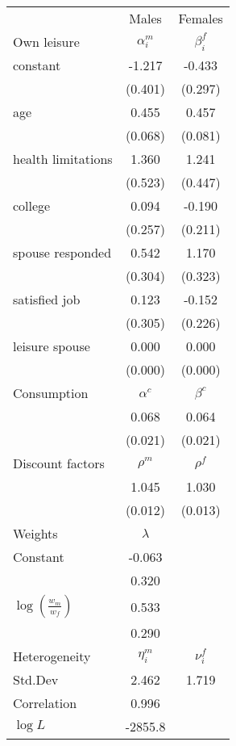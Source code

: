 \begin{tabular}{lcc} 
\hline\hline 
 & Males & Females \\ 
Own leisure & $\alpha_{i}^{m}$ & $\beta_{i}^{f}$ \\ 
constant & -1.217 & -0.433 \\ 
 & (0.401) & (0.297) \\ 
age & 0.455 & 0.457 \\ 
 & (0.068) & (0.081) \\ 
health limitations & 1.360 & 1.241 \\ 
 & (0.523) & (0.447) \\ 
college & 0.094 & -0.190 \\ 
 & (0.257) & (0.211) \\ 
spouse responded & 0.542 & 1.170 \\ 
 & (0.304) & (0.323) \\ 
satisfied job & 0.123 & -0.152 \\ 
 & (0.305) & (0.226) \\ 
leisure spouse & 0.000 & 0.000 \\ 
 & (0.000) & (0.000) \\ 
Consumption & $\alpha^{c}$ & $\beta^{c}$ \\ 
 & 0.068 & 0.064 \\ 
 & (0.021) & (0.021) \\ 
Discount factors & $\rho^m$ & $\rho^f$ \\ 
 & 1.045 & 1.030 \\ 
 & (0.012) & (0.013) \\ 
Weights & $\lambda$ &  \\ 
Constant & -0.063 &  \\ 
 & 0.320 &  \\ 
$\log(\frac{w_m}{w_f})$ & 0.533 &  \\ 
 & 0.290 &  \\ 
Heterogeneity & $\eta_i^m$ & $\nu_i^f$ \\ 
Std.Dev & 2.462 & 1.719 \\ 
Correlation & 0.996 &  \\ 
\hline 
$\log L$ & -2855.8 & \\ 
\hline \hline 
\end{tabular} 
